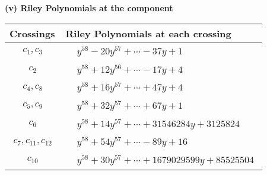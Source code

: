 \documentclass[1p]{elsarticle_modified}
\theoremstyle{definition}
\begin{document}
\newpage\renewcommand{\arraystretch}{1}
\flushleft \textbf{(v) Riley Polynomials at the component}\newline \\
\begin{tabular}{m{50pt}|m{274pt}}
Crossings & \hspace{64pt}Riley Polynomials at each crossing \\
\hline $$\begin{aligned}c_{1},c_{3}\end{aligned}$$&$\begin{aligned}
&y^{58}-20 y^{57}+\cdots-37 y+1
\end{aligned}$\\
\hline $$\begin{aligned}c_{2}\end{aligned}$$&$\begin{aligned}
&y^{58}+12 y^{56}+\cdots-17 y+4
\end{aligned}$\\
\hline $$\begin{aligned}c_{4},c_{8}\end{aligned}$$&$\begin{aligned}
&y^{58}+16 y^{57}+\cdots+47 y+4
\end{aligned}$\\
\hline $$\begin{aligned}c_{5},c_{9}\end{aligned}$$&$\begin{aligned}
&y^{58}+32 y^{57}+\cdots+67 y+1
\end{aligned}$\\
\hline $$\begin{aligned}c_{6}\end{aligned}$$&$\begin{aligned}
&y^{58}+14 y^{57}+\cdots+31546284 y+3125824
\end{aligned}$\\
\hline $$\begin{aligned}c_{7},c_{11},c_{12}\end{aligned}$$&$\begin{aligned}
&y^{58}+54 y^{57}+\cdots-89 y+16
\end{aligned}$\\
\hline $$\begin{aligned}c_{10}\end{aligned}$$&$\begin{aligned}
&y^{58}+30 y^{57}+\cdots+1679029599 y+85525504
\end{aligned}$\\
\hline
\end{tabular}\\~\\
\end{document}
